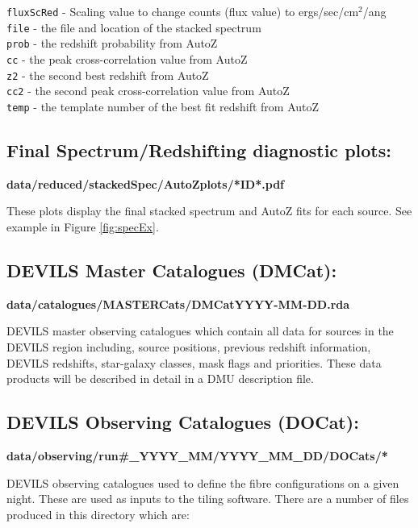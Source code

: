 \documentclass[12pt]{article}
\begin{document}
\texttt{fluxScRed}  - Scaling value to change counts (flux value) to ergs/sec/cm$^2$/ang\\
\texttt{file} - the file and location of the stacked spectrum\\
\texttt{prob} - the redshift probability from AutoZ\\
\texttt{cc} - the peak cross-correlation value from AutoZ\\
\texttt{z2} - the second best redshift from AutoZ\\
\texttt{cc2} - the second peak cross-correlation value from AutoZ\\
\texttt{temp} - the template number of the best fit redshift from AutoZ \\


  \subsection{Final Spectrum/Redshifting diagnostic plots:}
  
  \textbf{data/reduced/stackedSpec/AutoZplots/*ID*.pdf} 
  
  These plots display the final stacked spectrum and AutoZ fits for each source. See example in Figure \ref{fig:specEx}.
 
 \subsection{DEVILS Master Catalogues (DMCat):}
 
\textbf{data/catalogues/MASTERCats/DMCatYYYY-MM-DD.rda} 
   
DEVILS master observing catalogues which contain all data for sources in the DEVILS region including, source positions, previous redshift information, DEVILS redshifts, star-galaxy classes, mask flags and priorities. These data products will be described in detail in a DMU description file.
 
  
 

 \subsection{DEVILS Observing Catalogues (DOCat):}
 
 \textbf{data/observing/run\#\_YYYY\_MM/YYYY\_MM\_DD/DOCats/*} 
   
DEVILS observing catalogues used to define the fibre configurations on a given night. These are used as inputs to the tiling software. There are a number of files produced in this directory which are:\\
\end{document}
